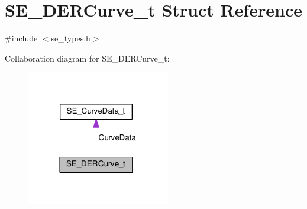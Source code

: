 \hypertarget{structSE__DERCurve__t}{}\section{S\+E\+\_\+\+D\+E\+R\+Curve\+\_\+t Struct Reference}
\label{structSE__DERCurve__t}


{\ttfamily \#include $<$se\+\_\+types.\+h$>$}



Collaboration diagram for S\+E\+\_\+\+D\+E\+R\+Curve\+\_\+t\+:\nopagebreak
\begin{figure}[H]
\begin{center}
\leavevmode
\includegraphics[width=177pt]{structSE__DERCurve__t__coll__graph}
\end{center}
\end{figure}
